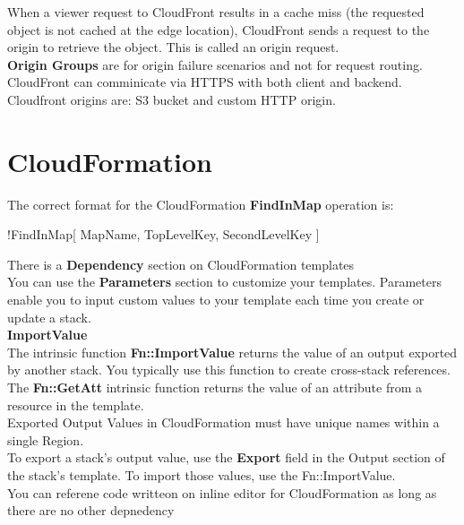 \documentclass[12pt, letterpaper, twoside]{article}
\begin{document}
When a viewer request to CloudFront results in a cache miss (the requested object is not cached at the edge location), 
CloudFront sends a request to the origin to retrieve the object. This is called an origin request.\\

\textbf{Origin Groups} are for origin failure scenarios and not for request routing.\\

CloudFront can comminicate via HTTPS with both client and backend.\\

Cloudfront origins are: S3 bucket and custom HTTP origin.\\
\section{CloudFormation}
The correct format for the CloudFormation \textbf{FindInMap} operation is:\\

\centerline{!FindInMap[ MapName, TopLevelKey, SecondLevelKey ]}
There is a \textbf{Dependency} section on CloudFormation templates\\

You can use the \textbf{Parameters} section to customize your templates. Parameters enable 
you to input custom values to your template each time you create or update a stack.\\

\textbf{\!ImportValue}\\
The intrinsic function \textbf{Fn::ImportValue} returns the value of an output exported by another stack. 
You typically use this function to create cross-stack references.\\

The \textbf{Fn::GetAtt} intrinsic function returns the value of an attribute from a resource in the template.\\

Exported Output Values in CloudFormation must have unique names within a single Region.\\

To export a stack's output value, use the \textbf{Export} field in the Output section of the stack's template. 
To import those values, use the Fn::ImportValue.\\

You can referene code writteon on inline editor for CloudFormation as long as there are no other depnedency
\end{document}
